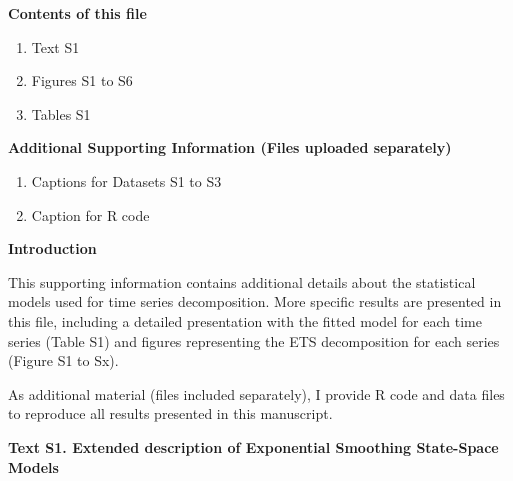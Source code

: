 \documentclass[draft,grl]{agutexSI}
\begin{document}
\begin{article}

%
%



\noindent\textbf{Contents of this file}
\begin{enumerate}
\item Text S1
\item Figures S1 to S6
\item Tables S1
\end{enumerate}
\noindent\textbf{Additional Supporting Information (Files uploaded separately)}
\begin{enumerate}
\item Captions for Datasets S1 to S3
\item Caption for R code 
\end{enumerate}

\newpage

\noindent\textbf{Introduction}

This supporting information contains additional details about the statistical models used for time series decomposition. More specific results are presented in this file, including a detailed presentation with the fitted model for each time series (Table S1) and figures representing the ETS decomposition for each series (Figure S1 to Sx). 

As additional material (files included separately), I provide R code and data files to reproduce all results presented in this manuscript. 

\vspace{1cm}

\noindent\textbf{Text S1. Extended description of Exponential Smoothing State-Space Models}
%


\end{article}
\end{document}
